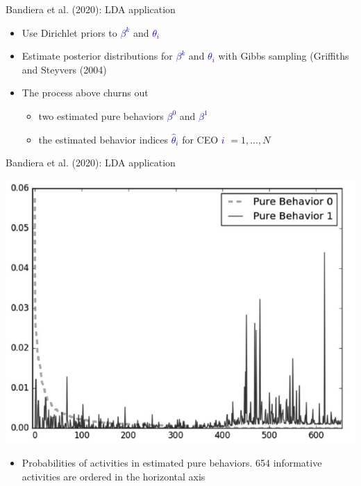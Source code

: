\documentclass[english]{beamer}
\begin{document}
\begin{frame}{Bandiera et al. (2020): LDA application}
\begin{itemize}
\setlength{\itemsep}{1.5em}
\item Use Dirichlet priors to \textcolor{blue}{$\beta^k$} and \textcolor{blue}{$\theta_i$}
\item Estimate posterior distributions for \textcolor{blue}{$\beta^k$} and \textcolor{blue}{$\theta_i$} with Gibbs sampling (Griffiths and Steyvers (2004)
\item The process above churns out
\begin{itemize}
    \item two estimated pure behaviors \textcolor{blue}{$\beta^0$} and \textcolor{blue}{$\beta^1$}
    \item the estimated behavior indices \textcolor{blue}{$\hat{\theta}_i$} for CEO \textcolor{blue}{$i$} $= 1,...,N$
\end{itemize}
\end{itemize}
\end{frame}%

\begin{frame}{Bandiera et al. (2020): LDA application}
\vspace{-7pt}
\begin{center}
\includegraphics[scale=0.5]{Images/bandiera2017b.png}
\end{center}
\begin{itemize}
    \item Probabilities of activities in estimated pure behaviors. 654 informative activities are ordered in the horizontal axis
\end{itemize}
\end{frame}
\end{document}
